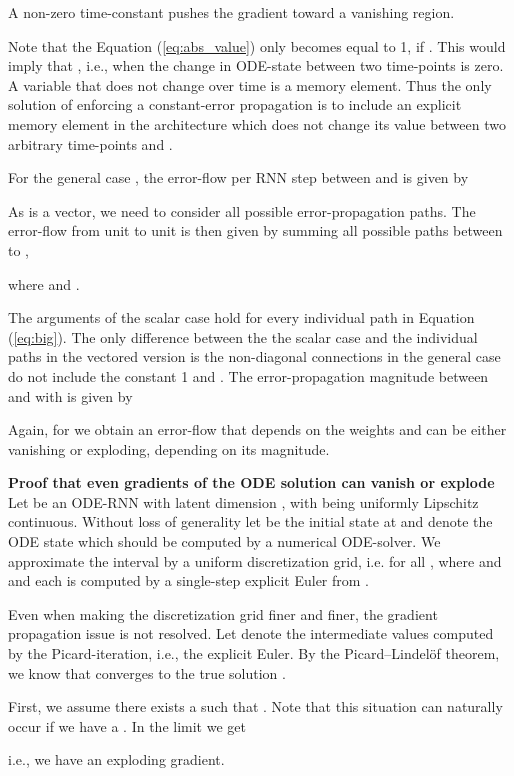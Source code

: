 \documentclass{article}
\begin{document}
A non-zero time-constant  pushes the gradient toward a vanishing region.

Note that the Equation (\ref{eq:abs_value}) only becomes equal to 1, if . This would imply that , i.e., when the change in ODE-state between two time-points is zero. A variable that does not change over time is a memory element. Thus the only solution of enforcing a constant-error propagation is to include an explicit memory element in the architecture \cite{hochreiter1997long} which does not change its value between two arbitrary time-points  and .

For the general case , the error-flow per RNN step between  and  is given by

As  is a vector, we need to consider all possible error-propagation paths.
The error-flow from unit  to unit  is then given by summing all  possible paths between  to ,

where  and .

The arguments of the scalar case hold for every individual path in Equation (\ref{eq:big}).
The only difference between the the scalar case and the individual paths in the vectored version is the non-diagonal connections in the general case do not include the constant 1 and . The error-propagation magnitude between  and  with  is given by 


Again, for  we obtain an error-flow that depends on the weights  and can be either vanishing or exploding, depending on its magnitude.

\textbf{Proof that even gradients of the ODE solution can vanish or explode}
Let  be an ODE-RNN with latent dimension , with  being uniformly Lipschitz continuous. Without loss of generality let  be the initial state at  and  denote the ODE state which should be computed by a numerical ODE-solver.
We approximate the interval  by a uniform discretization grid, i.e.  for all  , where  and  and each  is computed by a single-step explicit Euler from . 

Even when making the discretization grid  finer and finer, the gradient propagation issue is not resolved. Let  denote the intermediate values computed by the Picard-iteration, i.e., the explicit Euler. By the Picard–Lindelöf theorem, we know that  converges to the true solution . 

First, we assume there exists a  such that  . Note that this situation can naturally occur if we have a  .
In the limit  we get

i.e., we have an exploding gradient.
\end{document}
